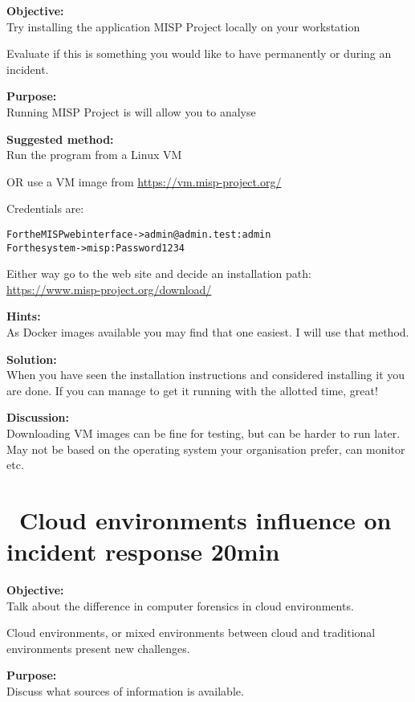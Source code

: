 \documentclass[a4paper,11pt,notitlepage]{report}
\begin{document}
{\bf Objective:}\\
Try installing the application MISP Project locally on your workstation

Evaluate if this is something you would like to have permanently or during an incident.

{\bf Purpose:}\\
Running MISP Project is  will allow you to analyse

{\bf Suggested method:}\\
Run the program from a Linux VM

OR use a VM image from \url{https://vm.misp-project.org/}

Credentials are:
\begin{alltt}\footnotesize
For the MISP web interface -> admin@admin.test:admin
For the system -> misp:Password1234
\end{alltt}

Either way go to the web site and decide an installation path:\\
\url{https://www.misp-project.org/download/}

{\bf Hints:}\\
As Docker images available you may find that one easiest. I will use that method.

{\bf Solution:}\\
When you have seen the installation instructions and considered installing it you are done. If you can manage to get it running with the allotted time, great!

{\bf Discussion:}\\
Downloading VM images can be fine for testing, but can be harder to run later. May not be based on the operating system your organisation prefer, can monitor etc.



\chapter{\faInfoCircle\ Cloud environments influence on incident response 20min}
\label{ex:cloud-incident-response}

{\bf Objective:}\\
Talk about the difference in computer forensics in cloud environments.

Cloud environments, or mixed environments between cloud and traditional environments present new challenges.

{\bf Purpose:}\\
Discuss what sources of information is available.
\end{document}
